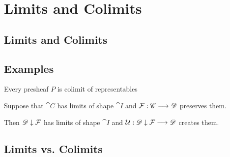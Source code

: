 	\newpage
	\section{Limits and Colimits}
	\subsection{Limits and Colimits}

	\begin{definition}
	\end{definition}

	\begin{lemma}
	\end{lemma}

	\subsection{Examples}

	\begin{proposition}
	\end{proposition}

	\begin{theorem}
		Every presheaf $P$ is colimit of representables
	\end{theorem}

	\begin{proposition}
		Suppose that $\cat{C}$ has limits of shape $\cat{I}$ and $\mathcal{F}:\mathscr{C} --> \mathscr{D}$ preserves them.

		Then $\mathscr{D} \downarrow \mathcal{F}$ has limits of shape $\cat{I}$ and $\mathcal{U}: \mathscr{D} \downarrow \mathcal{F} --> \mathscr{D}$ creates them.
	\end{proposition}

	\subsection{Limits vs. Colimits}
